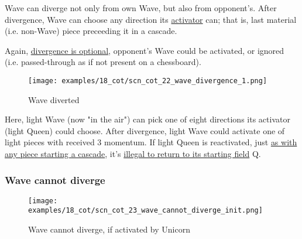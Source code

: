 \vspace*{-0.4\baselineskip}
Wave can diverge not only from own Wave, but also from opponent's. After divergence,
Wave can choose any direction its
\hyperref[fig:scn_mv_27_wave_cascading_steps]{activator} can; that is, last material
(i.e. non-Wave) piece preceeding it in a cascade.

Again, \hyperref[fig:scn_cot_09_own_shaman_is_divergent_init]{divergence is optional},
opponent's Wave could be activated, or ignored (i.e. passed-through as if not present
on a chessboard).

\clearpage %

\vspace*{-2.1\baselineskip}
\noindent
\begin{figure}[!h]
\texttt{[image: examples/18\_cot/scn\_cot\_22\_wave\_divergence\_1.png]}
\vspace*{-1.3\baselineskip}
\caption{Wave diverted}
\label{fig:scn_cot_22_wave_divergence_1}
\end{figure}

\vspace*{-0.4\baselineskip}
Here, light Wave (now "in the air") can pick one of eight directions its activator
(light Queen) could choose. After divergence, light Wave could activate one of light
pieces with received 3 momentum. If light Queen is reactivated, just
\hyperref[fig:scn_mv_43_static_move_is_illegal_init]{as with any piece starting a cascade}, it's
\hyperref[fig:scn_cot_10_own_shaman_is_divergent_end]{illegal to return to its starting field} Q.

\clearpage %

\subsubsection*{Wave cannot diverge}
\label{sec:Conquest of Tlalocan/Shaman/Divergence/Wave cannot diverge/1}

\vspace*{-1.4\baselineskip}
\noindent
\begin{figure}[!h]
\texttt{[image: examples/18\_cot/scn\_cot\_23\_wave\_cannot\_diverge\_init.png]}
\vspace*{-1.3\baselineskip}
\caption{Wave cannot diverge, if activated by Unicorn}
\label{fig:scn_cot_23_wave_cannot_diverge_init}
\end{figure}

